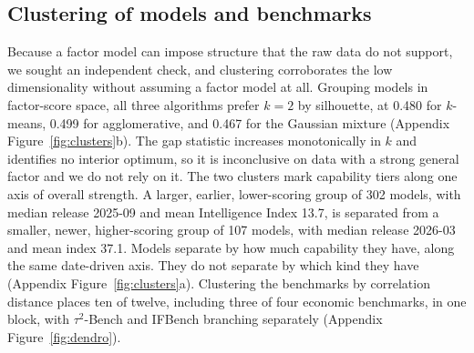 \subsection{Clustering of models and benchmarks}\label{sec:clustering}
Because a factor model can impose structure that the raw data do not support, we sought an independent check, and clustering corroborates the low dimensionality without assuming a factor model at all. Grouping models in factor-score space, all three
algorithms prefer $k=2$ by silhouette, at 0.480 for $k$-means, 0.499 for agglomerative, and 0.467 for
the Gaussian mixture (Appendix Figure~\ref{fig:clusters}b). The gap statistic increases monotonically in $k$ and identifies no interior optimum, so it is inconclusive on data with a strong general factor and we do not rely on it. The
two clusters mark capability tiers along one axis of overall strength. A larger, earlier, lower-scoring group
of 302 models, with median release 2025-09 and mean Intelligence Index 13.7, is separated from a
smaller, newer, higher-scoring group of 107 models, with median release 2026-03 and mean index 37.1.
Models separate by how much capability they have, along the same date-driven axis. They do not separate by which kind
they have (Appendix Figure~\ref{fig:clusters}a). Clustering the benchmarks by correlation distance places ten of
twelve, including three of four economic benchmarks, in one block, with $\tau^2$-Bench and IFBench
branching separately (Appendix Figure~\ref{fig:dendro}).

\FloatBarrier
